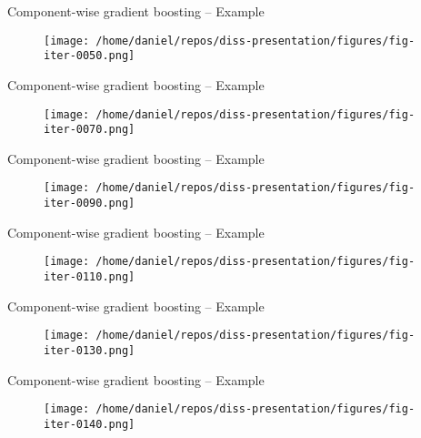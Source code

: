 \begin{frame}{Component-wise gradient boosting -- Example}
	\begin{figure}
		\centering
		\texttt{[image: /home/daniel/repos/diss-presentation/figures/fig-iter-0050.png]}
	\end{figure}
	\addtocounter{framenumber}{-1}
\end{frame}


\begin{frame}{Component-wise gradient boosting -- Example}
	\begin{figure}
		\centering
		\texttt{[image: /home/daniel/repos/diss-presentation/figures/fig-iter-0070.png]}
	\end{figure}
	\addtocounter{framenumber}{-1}
\end{frame}


\begin{frame}{Component-wise gradient boosting -- Example}
	\begin{figure}
		\centering
		\texttt{[image: /home/daniel/repos/diss-presentation/figures/fig-iter-0090.png]}
	\end{figure}
	\addtocounter{framenumber}{-1}
\end{frame}


\begin{frame}{Component-wise gradient boosting -- Example}
	\begin{figure}
		\centering
		\texttt{[image: /home/daniel/repos/diss-presentation/figures/fig-iter-0110.png]}
	\end{figure}
	\addtocounter{framenumber}{-1}
\end{frame}


\begin{frame}{Component-wise gradient boosting -- Example}
	\begin{figure}
		\centering
		\texttt{[image: /home/daniel/repos/diss-presentation/figures/fig-iter-0130.png]}
	\end{figure}
	\addtocounter{framenumber}{-1}
\end{frame}


\begin{frame}{Component-wise gradient boosting -- Example}
	\begin{figure}
		\centering
		\texttt{[image: /home/daniel/repos/diss-presentation/figures/fig-iter-0140.png]}
	\end{figure}
	\addtocounter{framenumber}{-1}
\end{frame}


